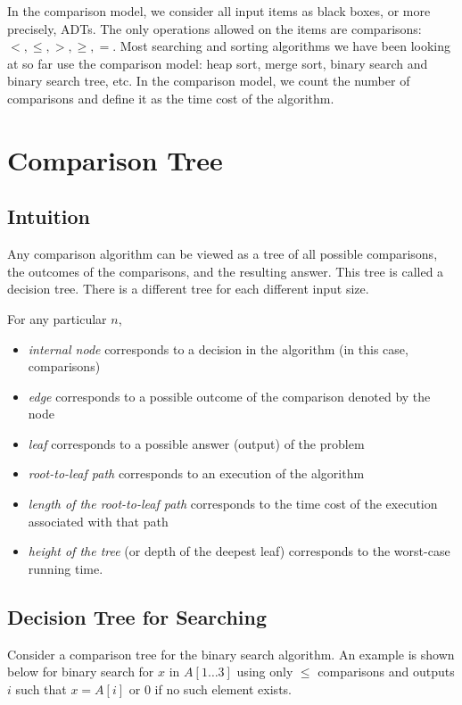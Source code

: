 In the comparison model, we consider all input items as black boxes, or more precisely, ADTs. The only operations allowed on the items are comparisons: $<, \leq, >, \geq, =$. Most searching and sorting algorithms we have been looking at so far use the comparison model: heap sort, merge sort, binary search and binary search tree, etc. In the comparison model, we count the number of comparisons and define it as the time cost of the algorithm.

\section{Comparison Tree}

\subsection{Intuition}

Any comparison algorithm can be viewed as a tree of all possible comparisons, the outcomes of the comparisons, and the resulting answer. This tree is called a decision tree. There is a different tree for each different input size.

For any particular $n$,
\begin{itemize}
    \item \textit{internal node} corresponds to a decision in the algorithm (in this case, comparisons)
    \item \textit{edge} corresponds to a possible outcome of the comparison denoted by the node
    \item \textit{leaf} corresponds to a possible answer (output) of the problem
    \item \textit{root-to-leaf path} corresponds to an execution of the algorithm
    \item \textit{length of the root-to-leaf path} corresponds to the time cost of the execution associated with that path
    \item \textit{height of the tree} (or depth of the deepest leaf) corresponds to the worst-case running time.
\end{itemize}


\subsection{Decision Tree for Searching}

Consider a comparison tree for the binary search algorithm. An example is shown below for binary search for $x$ in $A[1\ldots 3]$ using only $\leq$ comparisons and outputs $i$ such that $x=A[i]$ or 0 if no such element exists.

